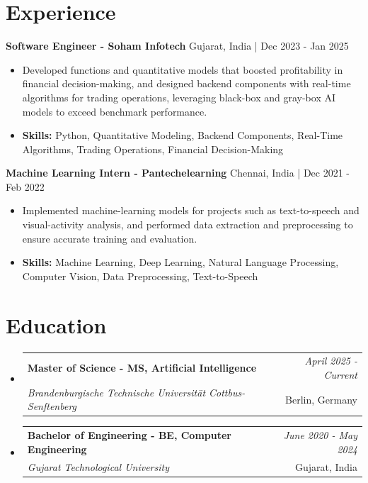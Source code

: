 \documentclass[a4paper,11pt]{article}
\makeatletter
\newcommand{\resumeSubheading}[4]{
\vspace{0.5mm}\item
    \begin{tabular*}{\linewidth}[t]{l@{\extracolsep{\fill}}r}
        \textbf{#1} & \textit{\footnotesize{#4}} \\
        \textit{\footnotesize{#3}} &  \footnotesize{#2}\\
    \end{tabular*}
    \vspace{-2.4mm}
}
\makeatother
\begin{document}
\section{\textbf{Experience}}


\vspace{1mm}
  \textbf{Software Engineer - Soham Infotech} \hfill Gujarat, India | Dec 2023 - Jan 2025
\vspace{-1.5mm} %
\begin{itemize}
  \item Developed functions and quantitative models that boosted profitability in financial decision-making, and designed backend components with real-time algorithms for trading operations, leveraging black-box and gray-box AI models to exceed benchmark performance.

\vspace{-2mm}
  \item \textbf{Skills:} Python, Quantitative Modeling, Backend Components, Real-Time Algorithms, Trading Operations, Financial Decision-Making
\end{itemize}

\vspace{1mm}
  \textbf{Machine Learning Intern - Pantechelearning} \hfill Chennai, India | Dec 2021 - Feb 2022
\vspace{-1.5mm} %
\begin{itemize}
  \item Implemented machine-learning models for projects such as text-to-speech and visual-activity analysis, and performed data extraction and preprocessing to ensure accurate training and evaluation.
\vspace{-2mm}
  \item \textbf{Skills:} Machine Learning, Deep Learning, Natural Language Processing, Computer Vision, Data Preprocessing, Text-to-Speech
\end{itemize}\section{\textbf{Education}}
\vspace{-0.4mm}

\begin{itemize}[leftmargin=0.15in, label={}]
\resumeSubheading
{Master of Science - MS, Artificial Intelligence }{Berlin, Germany}
{Brandenburgische Technische Universität Cottbus-Senftenberg  }{April 2025 - Current}

\vspace{1.0mm} %
\resumeSubheading
{Bachelor of Engineering - BE, Computer Engineering  }{Gujarat, India}
{Gujarat Technological University }{June 2020 - May 2024}

\end{itemize}
\end{document}
